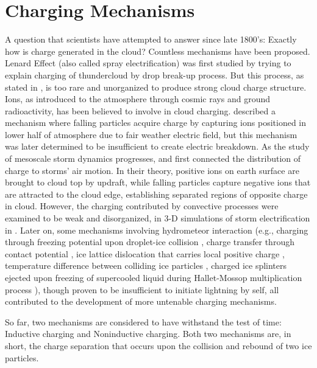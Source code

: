 \section{Charging Mechanisms}
A question that scientists have attempted to answer since late 1800's: Exactly how is charge generated in the cloud? Countless mechanisms have been proposed. Lenard Effect (also called spray electrification) was first studied by \cite{lenard1892berdie} trying to explain charging of thundercloud by drop break-up process. But this process, as stated in \cite{saunders2008charge}, is too rare and unorganized to produce strong cloud charge structure. Ions, as introduced to the  atmosphere through cosmic rays and  ground radioactivity, has been believed to involve in cloud charging. \cite{wilson1929some} described a mechanism where falling particles acquire charge by capturing ions positioned in lower half of atmosphere due to fair weather electric field, but this mechanism was later determined to be insufficient to create electric breakdown. As the study of mesoscale storm dynamics progresses, \cite{grenet1947essai} and \cite{vonnegut1953possible} first connected the distribution of charge to storms' air motion. In their theory, positive ions on earth surface are brought to cloud top by updraft, while falling particles capture negative ions that are attracted to the cloud edge, establishing separated regions of opposite charge in cloud. However, the charging contributed by convective processes were examined to be weak and disorganized, in 3-D simulations of storm electrification in \cite{helsdon2002examination}. Later on, some mechanisms involving hydrometeor interaction (e.g., charging through freezing potential upon droplet-ice collision \cite{workman1950electrical}, charge transfer through contact potential \cite{caranti1980surface}, ice lattice dislocation that carries local positive charge \cite{keith1990further}, temperature difference between colliding ice particles \cite{latham1961generation}, charged ice splinters ejected upon freezing of supercooled liquid during Hallet-Mossop multiplication process \cite{hallett1979charge}), though proven to be insufficient to initiate lightning by self, all contributed to the development of more untenable charging mechanisms.

So far, two mechanisms are considered to have withstand the test of time: Inductive charging and Noninductive charging. Both two mechanisms are, in short, the charge separation that occurs upon the collision and rebound of two ice particles. 

